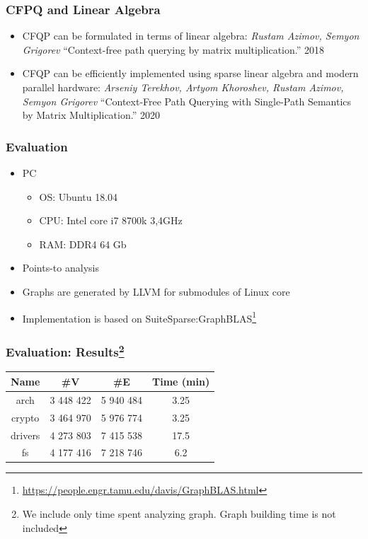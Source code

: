 \documentclass[xcolor=table]{beamer}
\begin{document}
\begin{frame}
  \frametitle{CFPQ and Linear Algebra}

  \begin{itemize}
    \item CFQP can be formulated in terms of linear algebra: \emph{Rustam Azimov, Semyon Grigorev} ``Context-free path querying by matrix multiplication.'' 2018 
    \item CFQP can be efficiently implemented using sparse linear algebra and modern parallel hardware: \emph{Arseniy Terekhov, Artyom Khoroshev, Rustam Azimov, Semyon Grigorev} ``Context-Free Path Querying with Single-Path Semantics by Matrix Multiplication.'' 2020 
  \end{itemize}
\end{frame}



\begin{frame} \frametitle{Evaluation}
\begin{itemize}
  \item PC
  \begin{itemize}
   \item OS: Ubuntu 18.04
   \item CPU: Intel core i7 8700k 3,4GHz
   \item RAM: DDR4 64 Gb
  \end{itemize}
  \pause
  \item Points-to analysis
  \item Graphs are generated by LLVM for submodules of Linux core
  \item Implementation is based on SuiteSparse:GraphBLAS\footnote{\url{https://people.engr.tamu.edu/davis/GraphBLAS.html}}
\end{itemize}
\end{frame}

\begin{frame}[fragile] \frametitle{Evaluation: Results\footnote{We include only time spent analyzing graph. Graph building time is not included}}
\begin{center}
  {
  \begin{tabular}{ c | c | c | c }
      
      Name           & \#V        & \#E        & Time (min) \\ 
      \hline
      \hline
      arch           & 3 448 422  & 5 940 484  & 3.25       \\
      crypto         & 3 464 970  & 5 976 774  & 3.25       \\
      drivers        & 4 273 803  & 7 415 538  & 17.5       \\
      fs             & 4 177 416  & 7 218 746  & 6.2        \\  
    \end{tabular}
    }
 \end{center}
\end{frame}
\end{document}
